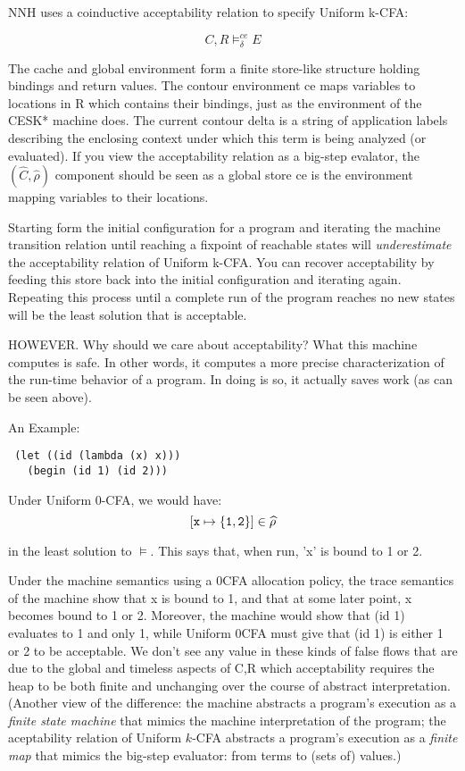 \documentclass{llncs}
\begin{document}
NNH uses a coinductive acceptability relation to specify Uniform
k-CFA:

\[
   C,R \models^{ce}_\delta E
\]

The cache and global environment form a finite store-like structure
holding bindings and return values.  The contour environment ce maps
variables to locations in R which contains their bindings, just as the
environment of the CESK* machine does.  The current contour delta is a
string of application labels describing the enclosing context under
which this term is being analyzed (or evaluated).  If you view the
acceptability relation as a big-step evalator, the
$(\widehat C,\widehat\rho)$ component should be seen as a global
store ce is the environment mapping variables to their locations.

Starting form the initial configuration for a program and iterating
the machine transition relation until reaching a fixpoint of reachable
states will \emph{underestimate} the acceptability relation of Uniform
k-CFA.  You can recover acceptability by feeding this store back into
the initial configuration and iterating again.  Repeating this process
until a complete run of the program reaches no new states will be the
least solution that is acceptable.

HOWEVER.  Why should we care about acceptability?  What this
machine computes is safe.  In other words, it computes a more
precise characterization of the run-time behavior of a program.  In
doing is so, it actually saves work (as can be seen above).

An Example:

\begin{verbatim}
 (let ((id (lambda (x) x)))
   (begin (id 1) (id 2)))
\end{verbatim}

Under Uniform 0-CFA, we would have:
\[
   [{\tt x} \mapsto \{{\tt 1}, {\tt 2}\}] \in \widehat\rho
\]

in the least solution to $\models$.  This says that, when run, 'x' is
bound to 1 or 2.

Under the machine semantics using a 0CFA allocation policy, the trace
semantics of the machine show that x is bound to 1, and that at some
later point, x becomes bound to 1 or 2.  Moreover, the machine would
show that (id 1) evaluates to 1 and only 1, while Uniform 0CFA must
give that (id 1) is either 1 or 2 to be acceptable.  We don't see any
value in these kinds of false flows that are due to the global and
timeless aspects of C,R which acceptability requires the heap to be
both finite and unchanging over the course of abstract
interpretation. (Another view of the difference: the machine abstracts
a program's execution as a \emph{finite state machine} that mimics the
machine interpretation of the program; the aceptability relation of
Uniform \(k\)-CFA abstracts a program's execution as a \emph{finite
  map} that mimics the big-step evaluator: from terms to (sets of)
values.)
\end{document}
